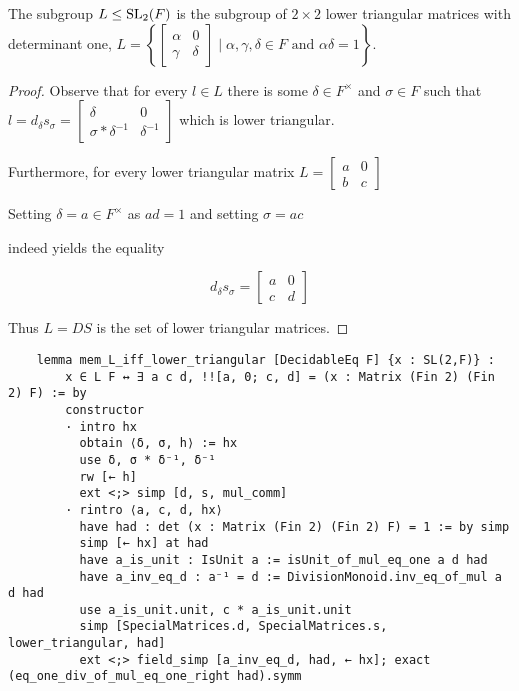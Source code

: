 \begin{corollary}
    \label{mem_L_iff_lower_triangular}
    \leanok
    The subgroup $L \le \operatorname{SL}_2(F)$ is the subgroup of $2 \times 2$ lower triangular matrices with determinant one, $L =\left\{\begin{bmatrix}
    \alpha & 0\\
    \gamma & \delta
    \end{bmatrix} \; | \; \alpha, \gamma, \delta \in F \text{ and } \alpha \delta = 1 \right\}$.
\end{corollary}
\begin{proof}
\leanok
    Observe that for every $l \in L$ there is some $\delta \in F^\times$ and $\sigma \in F$ such that $l  = d_\delta s_\sigma = \begin{bmatrix}
        \delta & 0\\
        \sigma * \delta^{-1} & \delta^{-1}
    \end{bmatrix}$ which is lower triangular. 
    
    Furthermore, for every lower triangular matrix $L = \begin{bmatrix}
        a & 0\\
        b & c
    \end{bmatrix}$ 
    
    Setting $\delta = a \in F^\times$ as $a d = 1$ and setting $\sigma = a c$

    indeed yields the equality

    \[
    d_\delta s_\sigma = \begin{bmatrix}
        a & 0\\
        c & d
    \end{bmatrix}
    \]

    Thus $L = D S$ is the set of lower triangular matrices.
\end{proof}
\begin{footnotesize}
    \begin{verbatim}
    lemma mem_L_iff_lower_triangular [DecidableEq F] {x : SL(2,F)} :
        x ∈ L F ↔ ∃ a c d, !![a, 0; c, d] = (x : Matrix (Fin 2) (Fin 2) F) := by
        constructor
        · intro hx
          obtain ⟨δ, σ, h⟩ := hx
          use δ, σ * δ⁻¹, δ⁻¹
          rw [← h]
          ext <;> simp [d, s, mul_comm]
        · rintro ⟨a, c, d, hx⟩
          have had : det (x : Matrix (Fin 2) (Fin 2) F) = 1 := by simp
          simp [← hx] at had
          have a_is_unit : IsUnit a := isUnit_of_mul_eq_one a d had
          have a_inv_eq_d : a⁻¹ = d := DivisionMonoid.inv_eq_of_mul a d had
          use a_is_unit.unit, c * a_is_unit.unit
          simp [SpecialMatrices.d, SpecialMatrices.s, lower_triangular, had]
          ext <;> field_simp [a_inv_eq_d, had, ← hx]; exact (eq_one_div_of_mul_eq_one_right had).symm
    \end{verbatim}
    \end{footnotesize}

